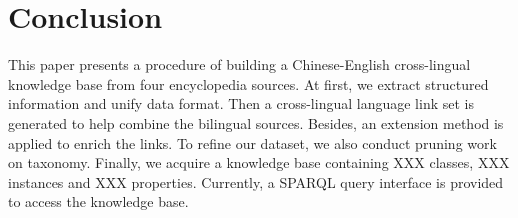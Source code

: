 \documentclass[runningheads,a4paper]{llncs}
\begin{document}

\section{Conclusion}
\label{sec:con}
This paper presents a procedure of building a Chinese-English cross-lingual knowledge base from four encyclopedia sources. At first, we extract structured information and unify data format. Then a cross-lingual language link set is generated to help combine the bilingual sources. Besides, an extension method is applied to enrich the links. To refine our dataset, we also conduct pruning work on taxonomy. Finally, we acquire a knowledge base containing XXX classes, XXX instances and XXX properties. Currently, a SPARQL query interface is provided to access the knowledge base. 





\end{document}

